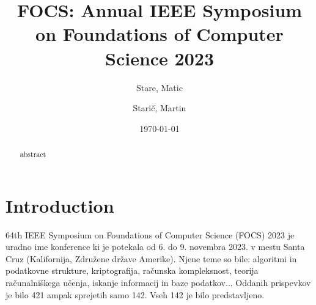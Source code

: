\documentclass{article}
\title{FOCS: Annual IEEE Symposium on Foundations of Computer Science 2023}
\author{
  Stare, Matic\\
  \and
  Starič, Martin\\
}
\date{\today}
\begin{document}
\maketitle

\tableofcontents
\newpage


\begin{abstract}
    abstract
\end{abstract}



\section{Introduction}

64th IEEE Symposium on Foundations of Computer Science (FOCS) 2023 je uradno ime konference ki je potekala od 6. do 9. novembra 2023. v mestu Santa Cruz (Kalifornija, Združene države Amerike). Njene teme so bile: algoritmi in podatkovne strukture, kriptografija, računska kompleksnost, teorija računalniškega učenja, iskanje informacij in baze podatkov... Oddanih prispevkov je bilo 421 ampak sprejetih samo 142. Vseh 142 je bilo predstavljeno.
\end{document}
